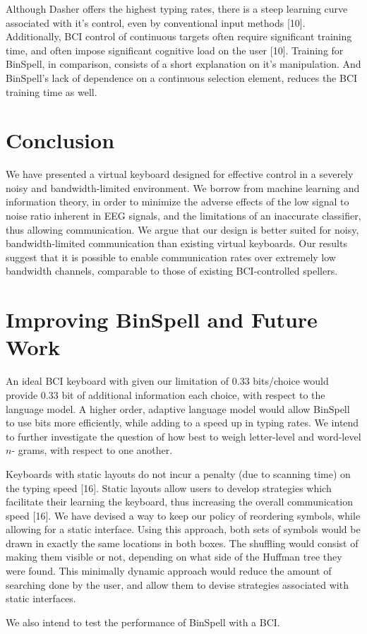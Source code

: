 \documentclass[12pt,titlepage]{article}
\begin{document}
Although Dasher offers the highest typing rates, there is a steep learning curve associated with 
it's control, even by conventional input methods [10].  Additionally, BCI control of continuous 
targets often require significant training time, and often impose significant cognitive load on 
the user [10].  Training for BinSpell, in comparison, consists of a short explanation on it's 
manipulation.  And BinSpell's lack of dependence on a continuous selection element, reduces 
the BCI training time as well.


\section{Conclusion}

We have presented a virtual keyboard designed for effective control in a severely noisy and
bandwidth-limited environment.  We borrow from machine learning and  information theory, in 
order to minimize the adverse effects of the low signal to noise ratio inherent in EEG signals, 
and the limitations of an inaccurate classifier, thus allowing communication.  We argue that our 
design is better suited for noisy, bandwidth-limited communication than existing virtual 
keyboards. Our results suggest that it is possible to enable communication rates over extremely 
low bandwidth channels, comparable to those of existing BCI-controlled spellers.


\section{Improving BinSpell and Future Work}

An ideal BCI keyboard with given our limitation of 0.33 bits/choice would provide 0.33 bit of 
additional information each choice, with respect to the language model.  A higher order, adaptive 
language model would allow BinSpell to use bits more efficiently, while adding to a speed up in typing 
rates.  We intend to further investigate the question of how best to weigh letter-level and word-level $n$- 
grams, with respect to one another. 

Keyboards with static layouts do not incur a penalty (due to scanning time) on the typing speed [16]. 
Static layouts allow users to develop strategies which facilitate their learning the keyboard, thus 
increasing the overall communication speed [16].  We have devised a way to keep our policy of 
reordering symbols, while allowing for a static interface.  Using this approach, both sets of symbols 
would be drawn in exactly the same locations in both boxes.  The  shuffling would consist of making 
them visible or not, depending on what side of the Huffman tree they were found.  This minimally 
dynamic approach would reduce the amount of searching done by the user, and allow them to devise 
strategies associated with static interfaces. 

We also intend to test the performance of BinSpell with a BCI.



\end{document}

